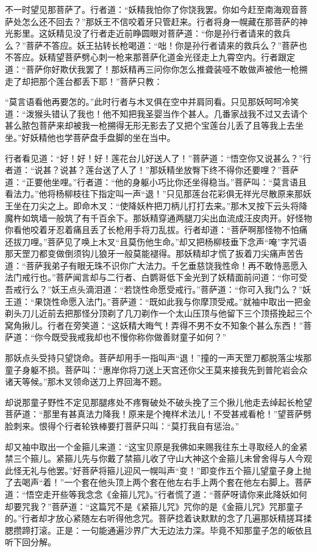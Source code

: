 \documentclass[12pt,UTF8]{ctexbook}
\begin{document}
{不一时望见那菩萨了。行者道：“妖精我怕你了你饶我罢。你如今赶至南海观音菩萨处怎么还不回去？”那妖王不信咬着牙只管赶来。行者将身一幌藏在那菩萨的神光影里。这妖精见没了行者走近前睁圆眼对菩萨道：“你是孙行者请来的救兵么？”菩萨不答应。妖王拈转长枪喝道：“咄！你是孙行者请来的救兵么？”菩萨也不答应。妖精望菩萨劈心刺一枪来那菩萨化道金光径走上九霄空内。行者跟定道：“菩萨你好欺伏我罢了！那妖精再三问你你怎么推聋装哑不敢做声被他一枪搠走了却把那个莲台都丢下耶！”菩萨只教：

“莫言语看他再要怎的。”此时行者与木叉俱在空中并肩同看。只见那妖呵呵冷笑道：“泼猴头错认了我也！他不知把我圣婴当作个甚人。几番家战我不过又去请个甚么脓包菩萨来却被我一枪搠得无形无影去了又把个宝莲台儿丢了且等我上去坐坐。”好妖精他也学菩萨盘手盘脚的坐在当中。

行者看见道：“好！好！好！莲花台儿好送人了！”菩萨道：“悟空你又说甚么？”行者道：“说甚？说甚？莲台送了人了！”那妖精坐放臀下终不得你还要哩？”菩萨道：“正要他坐哩。”行者道：“他的身躯小巧比你还坐得稳当。”菩萨叫：“莫言语且看法力。”他将杨柳枝往下指定叫一声“退！”只见那莲台花彩俱无祥光尽散原来那妖王坐在刀尖之上。即命木叉：“使降妖杵把刀柄儿打打去来。”那木叉按下云头将降魔杵如筑墙一般筑了有千百余下。那妖精穿通两腿刀尖出血流成汪皮肉开。好怪物你看他咬着牙忍着痛且丢了长枪用手将刀乱拔。行者却道：“菩萨啊那怪物不怕痛还拔刀哩。”菩萨见了唤上木叉“且莫伤他生命。”却又把杨柳枝垂下念声“唵”字咒语那天罡刀都变做倒须钩儿狼牙一般莫能褪得。那妖精却才慌了扳着刀尖痛声苦告道：“菩萨我弟子有眼无珠不识你广大法力。千乞垂慈饶我性命！再不敢恃恶愿入法门戒行也。”菩萨闻言却与二行者、白鹦哥低下金光到了妖精面前问道：“你可受吾戒行么？”妖王点头滴泪道：“若饶性命愿受戒行。”菩萨道：“你可入我门么？”妖王道：“果饶性命愿入法门。”菩萨道：“既如此我与你摩顶受戒。”就袖中取出一把金剃头刀儿近前去把那怪分顶剃了几刀剃作一个太山压顶与他留下三个顶搭挽起三个窝角揪儿。行者在旁笑道：“这妖精大晦气！弄得不男不女不知象个甚么东西！”菩萨道：“你今既受我戒我却也不慢你称你做善财童子如何？”

那妖点头受持只望饶命。菩萨却用手一指叫声“退！”撞的一声天罡刀都脱落尘埃那童子身躯不损。菩萨叫：“惠岸你将刀送上天宫还你父王莫来接我先到普陀岩会众诸天等候。”那木叉领命送刀上界回海不题。

却说那童子野性不定见那腿疼处不疼臀破处不破头挽了三个揪儿他走去绰起长枪望菩萨道：“那里有甚真法力降我！原来是个掩样术法儿！不受甚戒看枪！”望菩萨劈脸刺来。恨得个行者轮铁棒要打菩萨只叫：“莫打我自有惩治。”

却又袖中取出一个金箍儿来道：“这宝贝原是我佛如来赐我往东土寻取经人的金紧禁三个箍儿。紧箍儿先与你戴了禁箍儿收了守山大神这个金箍儿未曾舍得与人今观此怪无礼与他罢。”好菩萨将箍儿迎风一幌叫声“变！”即变作五个箍儿望童子身上抛了去喝声“着！”一个套在他头顶上两个套在他左右手上两个套在他左右脚上。菩萨道：“悟空走开些等我念念《金箍儿咒》。”行者慌了道：“菩萨呀请你来此降妖如何却要咒我？”菩萨道：“这篇咒不是《紧箍儿咒》咒你的是《金箍儿咒》咒那童子的。”行者却才放心紧随左右听得他念咒。菩萨捻着诀默默的念了几遍那妖精搓耳揉腮攒蹄打滚。正是：一句能通遍沙界广大无边法力深。毕竟不知那童子怎的皈依且听下回分解。

}
\end{document}
